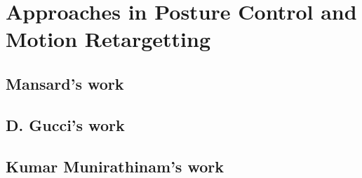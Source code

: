 \section{Approaches in Posture Control and Motion Retargetting}
\subsection{Mansard's work}
\subsection{D. Gucci's work}
\subsection{Kumar Munirathinam's work}

